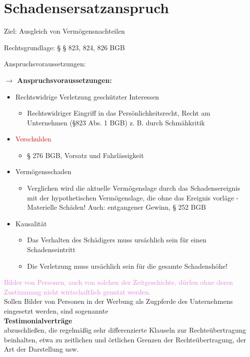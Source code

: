 \section{Schadensersatzanspruch}
\begin{arrowlist}
    \item Ziel: Ausgleich von Vermögensnachteilen
    \item Rechtsgrundlage: § § 823, 824, 826 BGB
    \item Anspruchsvoraussetzungen:
\end{arrowlist}
\textbf{$\rightarrow$ Anspruchsvoraussetzungen:}
\begin{itemize}
    \item Rechtswidrige Verletzung geschützter Interessen
    \begin{itemize}
        \item Rechtswidriger Eingriff in das Persönlichkeitsrecht, Recht am Unternehmen (§823 Abs. 1 BGB) z. B. durch Schmähkritik
    \end{itemize}
    \item \textcolor{red}{Verschulden}
    \begin{itemize}
        \item § 276 BGB, Vorsatz und Fahrlässigkeit
    \end{itemize}
    \item Vermögensschaden
    \begin{itemize}
        \item Verglichen wird die aktuelle Vermögenslage durch das Schadensereignis mit der hypothetischen Vermögenslage, die ohne das Ereignis vorläge - Materielle Schäden! Auch: entgangener Gewinn, § 252 BGB
    \end{itemize}
    \item Kausalität
    \begin{itemize}
        \item Das Verhalten des Schädigers muss ursächlich sein für einen Schadenseintritt
        \item Die Verletzung muss ursächlich sein für die gesamte Schadenshöhe!
    \end{itemize}
\end{itemize}
\textcolor{violet}{Bilder von Personen, auch von solchen der Zeitgeschichte, dürfen ohne deren Zustimmung nicht wirtschaftlich genutzt werden.}\\
Sollen Bilder von Personen in der Werbung als Zugpferde des Unternehmens eingesetzt werden, sind sogenannte\\
\textbf{Testimonialverträge}\\
abzuschließen, die regelmäßig sehr differenzierte Klauseln zur Rechteübertragung beinhalten, etwa zu zeitlichen und örtlichen Grenzen der Rechteübertragung, der Art der Darstellung usw.\\
